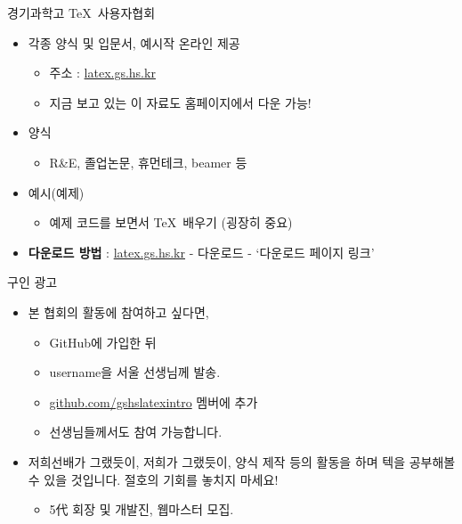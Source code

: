\documentclass[12pt]{gshs_lecture}
\begin{document}
\begin{frame}[t]{경기과학고 \TeX\ 사용자협회}
	\begin{itemize}
		\item 각종 양식 및 입문서, 예시작 온라인 제공
		\begin{itemize}
			\item 주소 : \url{latex.gs.hs.kr}
			\item 지금 보고 있는 이 자료도 홈페이지에서 다운 가능!
		\end{itemize}
		\item 양식
		\begin{itemize}
			\item R\&E, 졸업논문, 휴먼테크, beamer 등
		\end{itemize}
		\item 예시(예제)
		\begin{itemize}
			\item 예제 코드를 보면서 \TeX\ 배우기 (굉장히 중요)
		\end{itemize}
		\vspace{1cm}
		\item {\scriptsize \textbf{다운로드 방법} : \url{latex.gs.hs.kr} - 다운로드 - `다운로드 페이지 링크'}
	\end{itemize}
	
\end{frame}

\begin{frame}[t]{구인 광고}
	\begin{itemize}
		\item 본 협회의 활동에 참여하고 싶다면,
		\begin{itemize}
			\item GitHub에 가입한 뒤
			\item username을 서울 선생님께 발송.
			\item \url{github.com/gshslatexintro} 멤버에 추가
			\item 선생님들께서도 참여 가능합니다.
		\end{itemize}
		\vskip 1pc
		\item 저희선배가 그랬듯이, 저희가 그랬듯이, 양식 제작 등의 활동을 하며 텍을 공부해볼 수 있을 것입니다. 절호의 기회를 놓치지 마세요!
		\begin{itemize}
			\item 5代 회장 및 개발진, 웹마스터 모집.
		\end{itemize}
	\end{itemize}
	
\end{frame}
\end{document}
